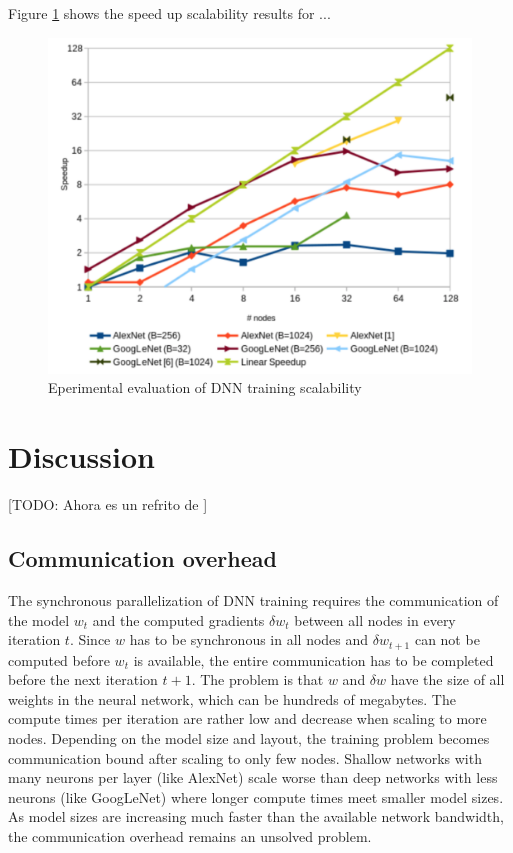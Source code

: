 \documentclass[journal]{IEEEtran}
\begin{document}
Figure \ref{fig:speedup1} shows the speed up scalability results for ...

\begin{figure}
\begin{center}
\centerline{\includegraphics[width=1.0\linewidth]{img/speedup}}
\caption{Eperimental evaluation of DNN training scalability}
\label{fig:speedup1}
\end{center}
\vspace{-0.5cm}
\end{figure}

\section{Discussion}

[TODO: Ahora es un refrito de \cite{DBLP:conf/sc/KeuperP16}]

\subsection{Communication overhead}

The synchronous parallelization of DNN training requires the communication of the model $w_t$ and the computed gradients $\delta w_t$ between all nodes in every iteration $t$. Since $w$ has to be synchronous in all nodes and $\delta w_{t+1}$ can not be computed before $w_t$ is available, the entire communication has to be completed before the next iteration $t + 1$. The problem is that $w$ and $\delta w$ have the size of all weights in the
neural network, which can be hundreds of megabytes. The compute times per iteration 
are rather low and decrease when scaling to more nodes. Depending on the model size and layout, the training problem becomes communication bound after scaling to only few nodes. Shallow networks with many neurons per layer (like AlexNet) scale worse than deep networks with less neurons (like GoogLeNet) where longer compute times meet smaller model sizes. As model sizes are increasing much faster than the available network bandwidth, the communication overhead remains an unsolved problem.
\end{document}
